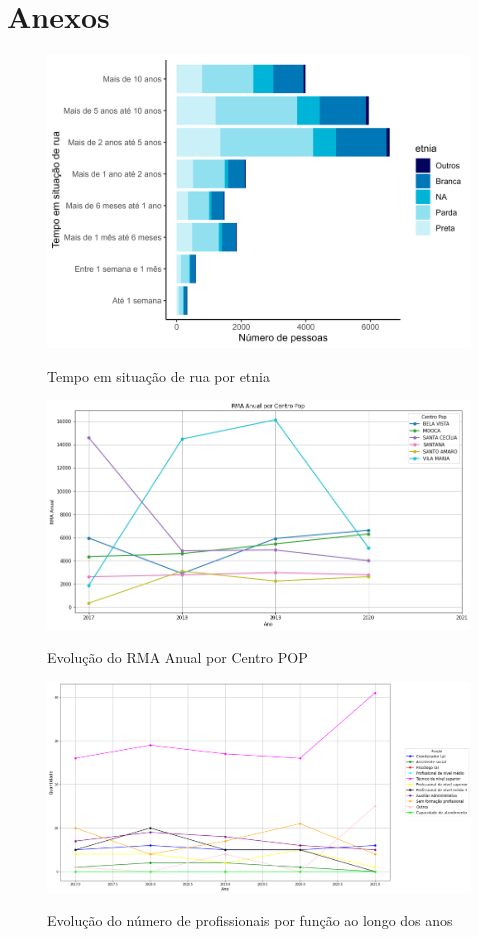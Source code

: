 \clearpage
\section{Anexos}

\begin{figure}[h]
    \centering
    \caption{Tempo em situação de rua por etnia}
    \includegraphics[width = .9\linewidth]{relatorios/grupo2/figuras/tempoderuaporetnia.png}
    \label{fig:tempoderuaetnia}
\end{figure}

\begin{figure}[h]
    \centering
    \caption{Evolução do RMA Anual por Centro POP}
    \includegraphics[width = .9\linewidth]{relatorios/grupo2/figuras/rma.png}
    \label{fig:rma}
\end{figure}

\begin{figure}[h]
    \centering
    \caption{Evolução do número de profissionais por função ao longo dos anos}
    \includegraphics[width = .9\linewidth]{relatorios/grupo2/figuras/prof.png}
    \label{fig:prof}
\end{figure}



